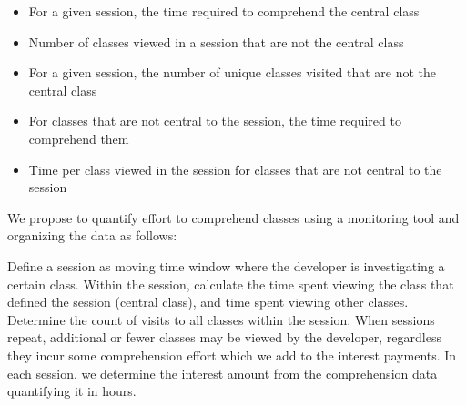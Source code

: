 \begin{itemize}
	\item[] For a given session, the time required to comprehend the central class
	\item[] Number of classes viewed in a session that are not the central class
	\item[] For a given session, the number of unique classes visited that are not the central class
	\item[] For classes that are not central to the session, the time required to comprehend them
	\item[] Time per class viewed in the session for classes that are not central to the session

\end{itemize}


We propose to quantify effort to comprehend classes using a monitoring tool and organizing the data as follows:

Define a session as moving time window where the developer is investigating a certain class.  Within the session, calculate the time spent viewing the class that defined the session (central class), and time spent viewing other classes.  Determine the count of visits to all classes within the session.   When sessions repeat, additional or fewer classes may be viewed by the developer, regardless they incur some comprehension effort which we add to the interest payments.  In each session, we determine the interest amount from the comprehension data quantifying it in hours.  

